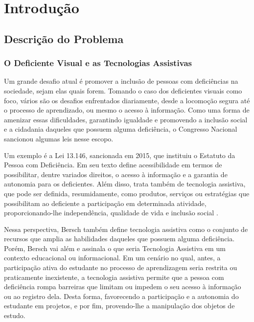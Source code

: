 \chapter{Introdução}
\label{ch:intro}

\section{Descrição do Problema}

\subsection{O Deficiente Visual e as Tecnologias Assistivas}

Um grande desafio atual é promover a inclusão de pessoas com deficiências na sociedade, sejam elas quais forem. Tomando o caso dos deficientes visuais como foco, vários são os desafios enfrentados diariamente, desde a locomoção segura até o processo de aprendizado, ou mesmo o acesso à informação. Como uma forma de amenizar essas dificuldades, garantindo igualdade e promovendo a inclusão social e a cidadania daqueles que possuem alguma deficiência, o Congresso Nacional sancionou algumas leis nesse escopo.

Um exemplo é a Lei 13.146, sancionada em 2015, que instituiu o Estatuto da Pessoa com Deficiência. Em seu texto define acessibilidade em termos de possibilitar, dentre variados direitos, o acesso à informação e a garantia de autonomia para os deficientes. Além disso, trata também de tecnologia assistiva, que pode ser definida, resumidamente, como produtos, serviços ou estratégias que possibilitam ao deficiente a participação em determinada atividade, proporcionando-lhe independência, qualidade de vida e inclusão social .

Nessa perspectiva, Bersch  também define tecnologia assistiva como o conjunto de recursos que amplia as habilidades daqueles que possuem alguma deficiência. Porém, Bersch  vai além e assinala o que seria Tecnologia Assistiva em um contexto educacional ou informacional. Em um cenário no qual, antes, a participação ativa do estudante no processo de aprendizagem seria restrita ou praticamente inexistente, a tecnologia assistiva permite que a pessoa com deficiência rompa barreiras que limitam ou impedem o seu acesso à informação ou ao registro dela. Desta forma, favorecendo a participação e a autonomia do estudante em projetos, e por fim, provendo-lhe a manipulação dos objetos de estudo.


